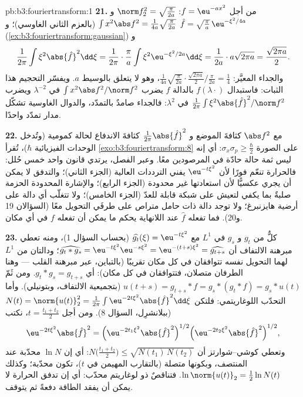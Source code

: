 \begin{solution}{pb:b3:fouriertransform:1}
\textbf{21.} من أجل $f = \eu^{-ax^2}$: $\norm f_2^2 =
\sqrt{\frac\pi{2a}}$ و $\int x^2\abs f^2 =
\frac1{4a}\sqrt{\frac{\pi}{2a}}$ (بالعزم الثاني
الغاوسي)؛ و
$\hat f = \sqrt{\frac\pi a}\,\eu^{-\xi^2/4a}$
(\cref{ex:b3:fouriertransform:gaussian}) و
\[
\frac1{2\pi}\int\xi^2\abs{\hat f}^2\dd\xi =
\frac1{2\pi}\cdot\frac\pi a\int\xi^2
\eu^{-\xi^2/2a}\dd\xi = \frac1{2a}\cdot a\sqrt{2\pi a}
= \frac{\sqrt{2\pi a}}2 .
\]
والجداء المعيَّر: $\frac1{4a}\sqrt{\frac\pi{2a}}\cdot
\frac{\sqrt{2\pi a}}2\big/\frac{\pi}{2a} = \frac14$، وهو لا يتعلق بالوسيط $a$. ويفسّر التحجيم
هذا الثبات: فاستبدال $f(\lambda\cdot)$ بالدالة $f$ يضرب $\int x^2\abs f^2/\norm
f^2$ في
$\lambda^{-2}$ ويضرب $\frac1{2\pi}\int\xi^2\abs{\hat
f}^2/\norm f^2$ في $\lambda^{2}$: فالجداء صامدٌ
بالتمدّد، والدوال الغاوسية تشكّل مدار تمدّد واحدًا.

\textbf{22.} مع $\abs f^2$ كثافةَ الموضع و $\frac1{2\pi}\abs{\hat f}^2$ كثافةَ
الاندفاع لحالة كمومية (وتُدخل الوحدات الفيزيائية $\hbar$)، تُقرأ
\cref{exo:b3:fouriertransform:8} على الصورة $\sigma_x\sigma_p
\geq \frac\hbar2$: أي إنه ليس ثمة حالة حادّة في
المرصودين معًا. وعبر الفصل، يرتدي قانون واحد خمس حُلل: فالحرارة
تنعّم فورًا لأن $\eu^{-t\xi^2}$ يفني الترددات العالية (الجزء
الثاني)؛ والتدفق لا يمكن أن يجري عكسيًّا لأن استعادتها غير
محدودة (الجزء الرابع)؛ والإشارة المحدودة الحزمة صلبةٌ بما يكفي
لتعيش على شبكة قابلة للعدّ (الجزء الخامس)؛ ولا تتغلّب أي دالة على
أرضية هايزنبرغ؛ ولا توجد دالة ذات حامل متراص على طرفَي التحويل
معًا (السؤالان 19 و20). فما تفعله $\hat f$ عند اللانهاية يحكم
ما يمكن أن تفعله $f$ في أي مكان.

\textbf{23.} كلٌّ من $g_t$ و $g_s$ في $L^1$ مع $\widehat{g_t}(\xi) = \eu^{-t\xi^2}$ (بحساب
السؤال 1)، ومنه تعطي مبرهنة الالتفاف أن $\widehat{g_t * g_s} = \eu^{-t\xi^2}\eu^{-s\xi^2} =
\eu^{-(t+s)\xi^2} = \widehat{g_{t+s}}$؛ ودالتان من
$L^1$ لهما التحويل نفسه تتوافقان في كل مكان تقريبًا (بالتباين،
عبر مبرهنة القلب --- وهنا الطرفان متصلان، فتتوافقان في كل
مكان): أي $g_t * g_s = g_{t+s}$. ومن ثَمّ
$u(t + s) = g_{t+s} * f = g_s * (g_t * f) = g_s * u(t)$
(بتجميعية الالتفاف، وبتونيلي). وأما التحدّب اللوغاريتمي: فلتكن
$N(t) = \norm{u(t)}_2^2 = \frac1{2\pi}\int
\eu^{-2t\xi^2}\abs{\hat f}^2\dd\xi$ (ببلانشرِل، السؤال 8). ومن أجل $t = \frac{t_1 + t_2}2$، نكتب
\[
\eu^{-2t\xi^2}\abs{\hat f}^2
= \Bigl(\eu^{-2t_1\xi^2}\abs{\hat f}^2\Bigr)^{1/2}
\Bigl(\eu^{-2t_2\xi^2}\abs{\hat f}^2\Bigr)^{1/2},
\]
وتعطي كوشي--شوارتز أن $N\bigl(\frac{t_1+t_2}2\bigr) \leq
\sqrt{N(t_1)\,N(t_2)}$: أي إن $\ln N$ محدّبة عند
المنتصف، وبكونها متصلة (بالتقارب المهيمن في $t$)، تكون محدّبة؛
وكذلك $\ln\norm{u(t)}_2 = \frac12\ln N(t)$. فتناقصٌ ذو لوغاريتم محدّب: أي إن تدفق الحرارة لا
يمكن أن يفقد الطاقة دفعةً ثم يتوقف.


\end{solution}
